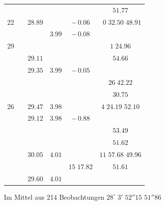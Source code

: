 \documentclass[12pt,a4paper]{article}
\begin{document}
\begin{center}
\begin{tabular}{c|c|c|c|c|c}
\phantom{13} & & & & & \phantom{0}\phantom{0}\phantom{0}\phantom{0}\phantom{0}\phantom{0}\phantom{0}\phantom{0}\phantom{0}\phantom{0}\phantom{0}\phantom{0}\phantom{0}\phantom{0}\phantom{0}$51.77$ \\
\phantom{13} 22 & & $28.89$ & & $-\,0.06$ & $\phantom{0}0\;32.50$ \quad $48.91$ \\
\phantom{13} & & & $3.99$ & $-\,0.08$ & \\
\phantom{13} 29 & & & & & $1\;24.96$ \\
\phantom{13} & & $29.11$ & & & \phantom{0}\phantom{0}\phantom{0}\phantom{0}\phantom{0}\phantom{0}\phantom{0}\phantom{0}\phantom{0}\phantom{0}\phantom{0}\phantom{0}\phantom{0}\phantom{0}\phantom{0}$54.66$ \\
\phantom{13} & & $29.35$ & $3.99$ & $-\,0.05$ & \\
\phantom{13} & & & & & $26\;42.22$ \\
& & & & & \phantom{0}\phantom{0}\phantom{0}\phantom{0}\phantom{0}\phantom{0}\phantom{0}\phantom{0}\phantom{0}\phantom{0}\phantom{0}\phantom{0}\phantom{0}\phantom{0}\phantom{0}$30.75$ \\
\phantom{13} 26 & & $29.47$ & $3.98$ & & $4\;24.19$ \quad $52.10$ \\
\phantom{13} & & $29.12$ & $3.98$ & $-\,0.88$ & \\
& & & & & \phantom{0}\phantom{0}\phantom{0}\phantom{0}\phantom{0}\phantom{0}\phantom{0}\phantom{0}\phantom{0}\phantom{0}\phantom{0}\phantom{0}\phantom{0}\phantom{0}\phantom{0}$53.49$ \\
& & & & & \phantom{0}\phantom{0}\phantom{0}\phantom{0}\phantom{0}\phantom{0}\phantom{0}\phantom{0}\phantom{0}\phantom{0}\phantom{0}\phantom{0}\phantom{0}\phantom{0}\phantom{0}$51.62$ \\
\phantom{13} & & $30.05$ & $4.01$ & & $11\;57.68$ \quad $49.96$ \\
& & & & $15\;17.82$ & \phantom{0}\phantom{0}\phantom{0}\phantom{0}\phantom{0}\phantom{0}\phantom{0}\phantom{0}\phantom{0}\phantom{0}\phantom{0}\phantom{0}\phantom{0}\phantom{0}\phantom{0}$51.61$ \\
& & $29.60$ & $4.01$ & & \\
\bottomrule
\end{tabular}
\end{center}

\begin{center}
Im Mittel aus 214 Beobachtungen \quad $28^{\circ}\;3'\;52''15$ \quad $51''86$
\end{center}
\end{document}
